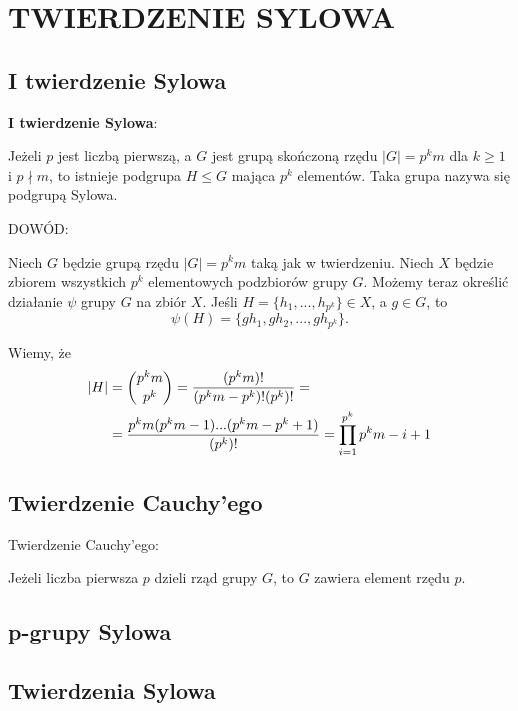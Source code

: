 \section{TWIERDZENIE SYLOWA}

\subsection{I twierdzenie Sylowa}

\pdef

\textbf{\color{def}I twierdzenie Sylowa}:
\smallskip

Jeżeli $p$ jest liczbą pierwszą, a $G$ jest grupą skończoną rzędu $|G|=p^km$ dla $k\geq 1$ i $p\nmid m$, to istnieje podgrupa $H\leq G$ mająca $p^k$ elementów. Taka grupa nazywa się {\color{acc}podgrupą Sylowa}.

\kdef

{\color{def}DOWÓD:}
\medskip

Niech $G$ będzie grupą rzędu $|G|=p^km$ taką jak w twierdzeniu. Niech $X$ będzie zbiorem wszystkich $p^k$ elementowych podzbiorów grupy $G$. Możemy teraz określić działanie $\psi$ grupy $G$ na zbiór $X$. Jeśli $H=\{h_1,...,h_{p^k}\}\in X$, a $g\in G$, to
$$\psi(H)=\{gh_1,gh_2,...,gh_{p^k}\}.$$

Wiemy, że
\begin{align*}
    |H|&={p^km\choose p^k}={(p^km)!\over (p^km-p^k)!(p^k)!}=\\
    &={p^km(p^km-1)...(p^km-p^k+1)\over (p^k)!}=\prod\limits_{i=1}^{p^k}{p^km-i+1}
\end{align*}

\subsection{Twierdzenie Cauchy'ego}

{\color{def}Twierdzenie Cauchy'ego:}

Jeżeli liczba pierwsza $p$ dzieli rząd grupy $G$, to $G$ zawiera element rzędu $p$.

\subsection{p-grupy Sylowa}

\subsection{Twierdzenia Sylowa}